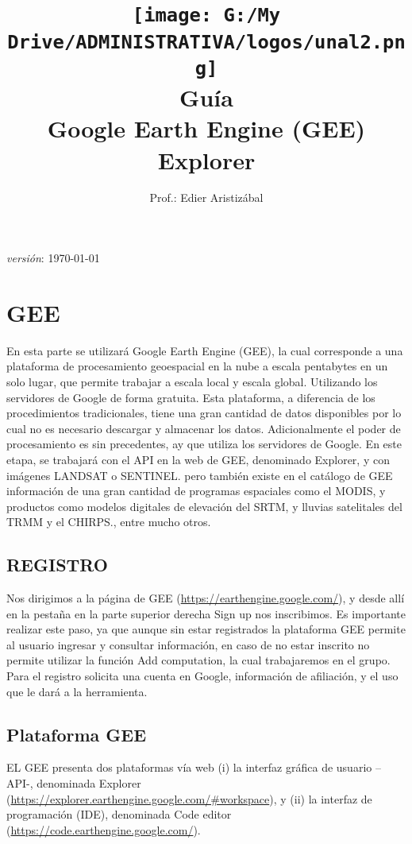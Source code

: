 \documentclass[a4paper,oneside,11pt,]{article}
\title {\texttt{[image: G:/My Drive/ADMINISTRATIVA/logos/unal2.png]}\\[5ex]
Guía\\ Google Earth Engine (GEE)\\Explorer}
\author{
Prof.: Edier Aristizábal
\date{}
}
\begin{document}
\maketitle

\emph {versión}: \today

\section{GEE}
En esta parte se utilizará Google Earth Engine (GEE), la cual corresponde a una plataforma de procesamiento geoespacial en la nube a escala pentabytes en un solo lugar, que permite trabajar a escala local y escala global. Utilizando los servidores de Google de forma gratuita. Esta plataforma, a diferencia de los procedimientos tradicionales, tiene una gran cantidad de datos disponibles por lo cual no es necesario descargar y almacenar los datos. Adicionalmente el poder de procesamiento es sin precedentes, ay que utiliza los servidores de Google. En este etapa, se trabajará con el API en la web de GEE, denominado Explorer, y con imágenes LANDSAT o SENTINEL. pero también existe en el catálogo de GEE información de una gran cantidad de programas espaciales como el MODIS, y productos como modelos digitales de elevación del SRTM, y lluvias satelitales del TRMM y el CHIRPS., entre mucho otros.


\subsection{REGISTRO}

Nos dirigimos a la página de GEE (\url{https://earthengine.google.com/}), y desde allí en la pestaña en la parte superior derecha Sign up nos inscribimos. Es importante realizar este paso, ya que aunque sin estar registrados la plataforma GEE permite al usuario ingresar y consultar información, en caso de no estar inscrito no permite utilizar la función Add computation, la cual trabajaremos en el grupo. Para el registro solicita una cuenta en Google, información de afiliación, y el uso que le dará a la herramienta.

\subsection{Plataforma GEE}

EL GEE presenta dos plataformas vía web (i) la interfaz gráfica de usuario – API-, denominada Explorer (\url{https://explorer.earthengine.google.com/#workspace}), y (ii) la interfaz de programación (IDE), denominada Code editor (\url{https://code.earthengine.google.com/}). 
\end{document}
